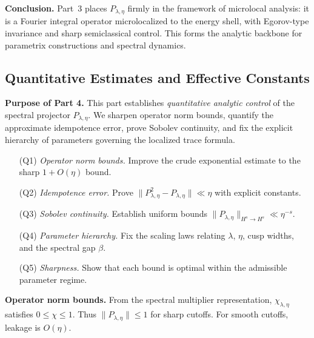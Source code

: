 \medskip
\noindent\textbf{Conclusion.}
Part~3 places $P_{\lambda,\eta}$ firmly in the framework of microlocal analysis:
it is a Fourier integral operator microlocalized to the energy shell,
with Egorov-type invariance and sharp semiclassical control.
This forms the analytic backbone for parametrix constructions and spectral dynamics.


\subsection{Quantitative Estimates and Effective Constants}
\label{subsec:proj-quantitative}

\noindent\textbf{Purpose of Part 4.}
This part establishes \emph{quantitative analytic control} of the spectral projector $P_{\lambda,\eta}$.
We sharpen operator norm bounds, quantify the approximate idempotence error, prove Sobolev continuity,
and fix the explicit hierarchy of parameters governing the localized trace formula.

\begin{itemize}
  \item[(Q1)] \emph{Operator norm bounds.} Improve the crude exponential estimate to the sharp $1+O(\eta)$ bound.  
  \item[(Q2)] \emph{Idempotence error.} Prove $\|P_{\lambda,\eta}^2-P_{\lambda,\eta}\|\ll\eta$ with explicit constants.  
  \item[(Q3)] \emph{Sobolev continuity.} Establish uniform bounds $\|P_{\lambda,\eta}\|_{H^s\to H^s}\ll\eta^{-s}$.  
  \item[(Q4)] \emph{Parameter hierarchy.} Fix the scaling laws relating $\lambda$, $\eta$, cusp widths, and the spectral gap $\beta$.  
  \item[(Q5)] \emph{Sharpness.} Show that each bound is optimal within the admissible parameter regime.  
\end{itemize}

\medskip
\noindent\textbf{Operator norm bounds.}
From the spectral multiplier representation, $\chi_{\lambda,\eta}$ satisfies $0\leq\chi\leq 1$.
Thus $\|P_{\lambda,\eta}\|\leq 1$ for sharp cutoffs.
For smooth cutoffs, leakage is $O(\eta)$.


